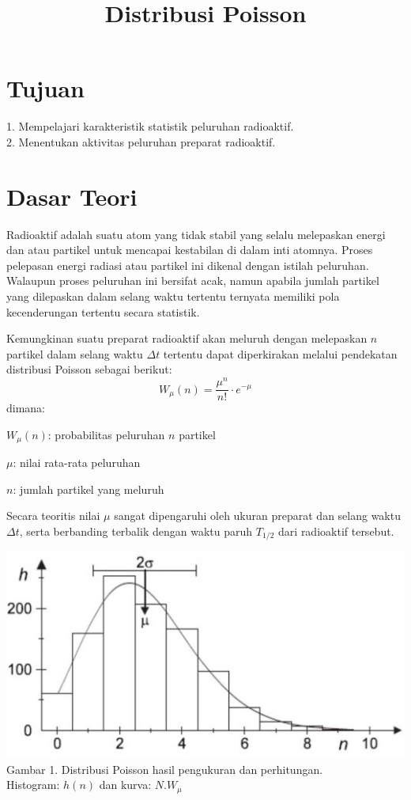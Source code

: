\documentclass{article}
\title{Distribusi Poisson}
\date{}
\author{}
\begin{document}
	\maketitle
	
	\section{Tujuan}
		1. Mempelajari karakteristik statistik peluruhan radioaktif.\\
		2. Menentukan aktivitas peluruhan preparat radioaktif.
	
	\section{Dasar Teori}
	 
		\hspace{0.35 cm} Radioaktif adalah suatu atom yang tidak stabil yang selalu melepaskan energi dan atau partikel untuk mencapai kestabilan di dalam inti atomnya. Proses pelepasan energi radiasi atau partikel ini dikenal dengan istilah peluruhan. Walaupun proses peluruhan ini bersifat acak, namun apabila jumlah partikel yang dilepaskan dalam selang waktu tertentu ternyata memiliki pola kecenderungan tertentu secara statistik.\par
		Kemungkinan suatu preparat radioaktif akan meluruh dengan melepaskan $n$ partikel dalam selang waktu $\Delta t$ tertentu dapat diperkirakan melalui pendekatan distribusi Poisson
		sebagai berikut: 
		\begin{equation}
		W_{\mu}(n) = \frac{\mu^n}{n!}\cdot e^{-\mu}
		\end{equation}
		dimana:
		\par $W_{\mu}(n)$: probabilitas peluruhan $n$ partikel
		\par $\mu$: nilai rata-rata peluruhan
		\par $n$: jumlah partikel yang meluruh \\
		
		\par Secara teoritis nilai $\mu$ sangat dipengaruhi oleh ukuran preparat dan selang waktu $\Delta t$, serta berbanding terbalik dengan waktu paruh $T_{1/2}$ dari radioaktif tersebut. 
	
		
		
		\begin{center}
			\includegraphics{./1.jpg}
			Gambar 1. Distribusi Poisson hasil pengukuran dan perhitungan. \\ Histogram: $h(n)$ dan kurva: $N.W_{\mu}$
		\end{center}
		
\end{document}
